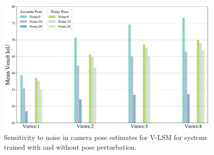 \begin{figure}
\centering
\includegraphics[width=0.95\linewidth]{figures/noisy_pose.pdf}
\caption{Sensitivity to noise in camera pose estimates for V-LSM for systems trained with and without pose perturbation.}
\end{figure}